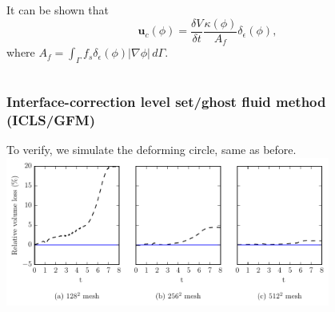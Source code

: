 \begin{frame}[t]
\begin{columns}[T]
\begin{column}{0.5\textwidth}
{\begin{bluecolorbox}
        It can be shown that
        \begin{equation}
          {\bm u}_c(\phi) = \frac{\delta V}{\delta t} \frac{\kappa(\phi)}{A_f} \delta_\epsilon (\phi),
        \end{equation}
        where $A_f = \int_\Gamma f_s \delta_\epsilon (\phi)|\nabla \phi| \,d\Gamma$.
        
      \end{bluecolorbox}
      } %
    \end{column}
    
  \end{columns}

\end{frame}
\begin{frame}[noframenumbering,t]
  \frametitle{Interface-correction level set/ghost fluid method (ICLS/GFM)}

  To verify, we simulate the deforming circle, same as before.
  \vskip0.2cm
  \centering
  \includegraphics[width=0.8\textwidth]{../paper1/Figures/serp_loss.pdf}
  \vskip0.3cm
  \pause

\end{frame}
